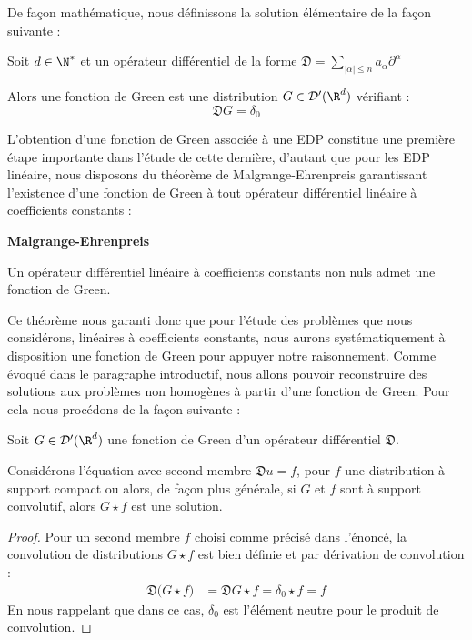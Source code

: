 De façon mathématique, nous définissons la solution élémentaire de la façon suivante :
\begin{definitionbox}
\begin{definition}
    Soit $d \in \N^*$ et un opérateur différentiel de la forme $\displaystyle \mathfrak{D} = \sum_{|\alpha| \leq n} a_{\alpha} \partial^{\alpha} $ 
    
    Alors une fonction de Green est une distribution $G \in \mathcal{D}'(\R^d)$ vérifiant :
    $$ \mathfrak{D}G = \delta_0 $$
\end{definition}
\end{definitionbox}
L'obtention d'une fonction de Green associée à une EDP constitue une première étape importante dans l'étude de cette dernière, d'autant que pour les EDP linéaire, nous disposons du théorème de Malgrange-Ehrenpreis garantissant l'existence d'une fonction de Green à tout opérateur différentiel linéaire à coefficients constants :
\begin{theorembox}
\begin{theorem} 
    \textbf{Malgrange-Ehrenpreis}

    Un opérateur différentiel linéaire à coefficients constants non nuls admet une fonction de Green.
    
\end{theorem}
\end{theorembox}
Ce théorème nous garanti donc que pour l'étude des problèmes que nous considérons, linéaires à coefficients constants, nous aurons systématiquement à disposition une fonction de Green pour appuyer notre raisonnement.
Comme évoqué dans le paragraphe introductif, nous allons pouvoir reconstruire des solutions aux problèmes non homogènes à partir d'une fonction de Green. Pour cela nous procédons de la façon suivante :
\begin{theorembox}
\begin{theorem}
    Soit $G \in \mathcal{D}'(\R^d)$ une fonction de Green d'un opérateur différentiel $\mathfrak{D}$. 
    
    \vspace{1em}

    Considérons l'équation avec second membre $\mathfrak{D}u = f$, pour $f$ une distribution à support compact ou alors, de façon plus générale, si $G$ et $f$ sont à support convolutif, alors $G \star f $ est une solution.

\end{theorem}
\end{theorembox} 
\begin{proof}
    Pour un second membre $f$ choisi comme précisé dans l'énoncé, la convolution de distributions $G \star f$ est bien définie et par dérivation de convolution :
    \begin{align*}
        \mathfrak{D}\Big( G \star f \Big) &= \mathfrak{D} G \star f = \delta_0 \star f = f
    \end{align*}
    En nous rappelant que dans ce cas, $\delta_0$ est l'élément neutre pour le produit de convolution.
\end{proof}
